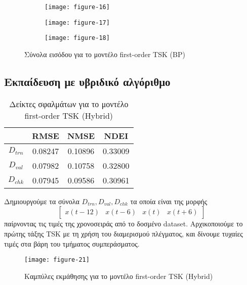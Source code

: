 \documentclass[11pt,a4paper,titlepage, oneside]{article}
\newlength\figureheight
\newlength\figurewidth
\begin{document}
			\begin{figure}[h]
			 	\setlength{}
				\setlength{}	
				\centering
				\begin{subfigure}[b]{0.32\textwidth}
					\texttt{[image: figure-16]}
				\end{subfigure}
				\begin{subfigure}[b]{0.32\textwidth}
					\texttt{[image: figure-17]}
				\end{subfigure}
				\begin{subfigure}[b]{0.32\textwidth}
					\texttt{[image: figure-18]}
				\end{subfigure}
				\caption{Σύνολα εισόδου για το μοντέλο first-order TSK (BP)}
				\label{fig:tsk_bp_input_sets}
			\end{figure}

			\clearpage

		\subsection{Εκπαίδευση με υβριδικό αλγόριθμο}
			\begin{wraptable}{r}{0.5\textwidth}
				\centering
				\begin{tabular}{c | c c c}
					 & \bfseries{RMSE} & \bfseries{NMSE} & \bfseries{NDEI} \\ \hline{}
					 $D_{trn}$ & 0.08247 & 0.10896 & 0.33009 \\ \hline
					 $D_{val}$ & 0.07982 & 0.10758 & 0.32800 \\ \hline
					 $D_{chk}$ & 0.07945 & 0.09586 & 0.30961 \\ 
				\end{tabular}
				\caption{Δείκτες σφαλμάτων για το μοντέλο first-order TSK (Hybrid)}
				\label{tab:tsk_hybrid_error_metrics}
			\end{wraptable}
			Δημιουργούμε τα σύνολα $D_{trn}, D_{val}, D_{chk}$ τα οποία είναι της μορφής 
			$$ \begin{bmatrix} x(t-12) & x(t-6) & x(t) & x(t+6) \end{bmatrix} $$
			παίρνοντας τις τιμές της χρονοσειράς από το δοσμένο dataset. Αρχικοποιούμε το πρώτης τάξης TSK με τη χρήση του διαμερισμού πλέγματος, και δίνουμε τυχαίες τιμές στα βάρη του τμήματος συμπεράσματος.\\
						
			\begin{wrapfigure}{r}{0.5\textwidth}
				\vspace{-15pt}
			 	\setlength{}
				\setlength{}	
				\centering
				\texttt{[image: figure-21]}
				\caption{Καμπύλες εκμάθησης για το μοντέλο first-order TSK (Hybrid)}
				\label{fig:tsk_hybrid_learning_curves}
			\end{wrapfigure}
			
\end{document}
